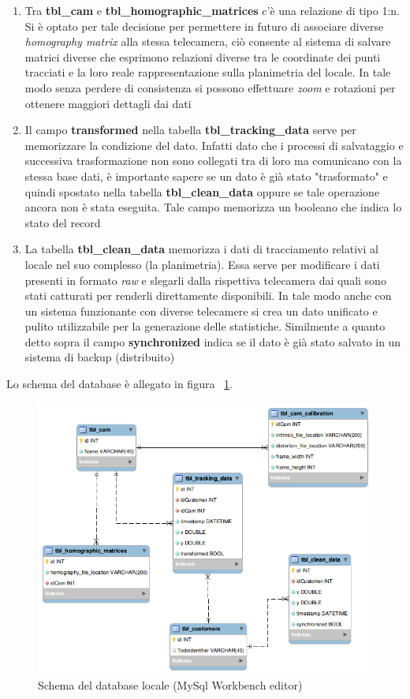 \documentclass[a4paper,13pt,twoside]{article}
\begin{document}
\begin{enumerate}
	\item Tra \textbf{tbl_cam} e \textbf{tbl_homographic_matrices} c'è una relazione di tipo 1:n. Si è optato per tale decisione per permettere in futuro di associare diverse \textit{homography matrix} alla stessa telecamera, ciò consente al sistema di salvare matrici diverse che esprimono relazioni diverse tra le coordinate dei punti tracciati e la loro reale rappresentazione sulla planimetria del locale. In tale modo senza perdere di consistenza si possono effettuare \textit{zoom} e rotazioni per ottenere maggiori dettagli dai dati
	\item Il campo \textbf{transformed} nella tabella \textbf{tbl_tracking_data} serve per memorizzare la condizione del dato. Infatti dato che i processi di salvataggio e successiva trasformazione non sono collegati tra di loro ma comunicano con la stessa base dati, è importante sapere se un dato è già stato "trasformato" e quindi spostato nella tabella \textbf{tbl_clean_data} oppure se tale operazione ancora non è stata eseguita. Tale campo memorizza un booleano che indica lo stato del record
	\item La tabella \textbf{tbl_clean_data} memorizza i dati di tracciamento relativi al locale nel suo complesso (la planimetria). Essa serve per modificare i dati presenti in formato \textit{raw} e slegarli dalla rispettiva telecamera dai quali sono stati catturati per renderli direttamente disponibili. In tale modo anche con un sistema funzionante con diverse telecamere si crea un dato unificato e pulito utilizzabile per la generazione delle statistiche. Similmente a quanto detto sopra il campo \textbf{synchronized} indica se il dato è già stato salvato in un sistema di backup (distribuito)
\end{enumerate}
Lo schema del database è allegato in figura ~\ref{fig:dbschema}.

\begin{figure}[!h]
\centering
\includegraphics[scale=0.5]{./images/dbschema.png}
\caption{Schema del database locale (MySql Workbench editor)}
\label{fig:dbschema}
\end{figure}
\end{document}
